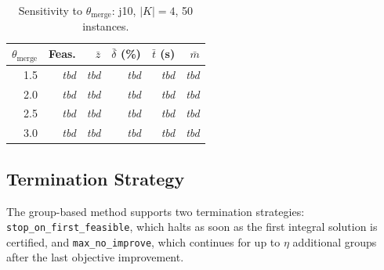 \begin{table}[htbp]
\centering
\renewcommand{\arraystretch}{1.35}
\caption{Sensitivity to $\theta_{\mathrm{merge}}$:
         j10, $|K|=4$, 50 instances.}
\label{tab:sens_merge}
\begin{tabular}{r r r r r r}
\hline
$\theta_{\mathrm{merge}}$ &
\textbf{Feas.} &
$\bar{z}$ &
$\bar{\delta}$ (\%) &
$\bar{t}$ (s) &
$\bar{m}$ \\
\hline
1.5 & \textit{tbd} & \textit{tbd} & \textit{tbd}
    & \textit{tbd} & \textit{tbd} \\
2.0 & \textit{tbd} & \textit{tbd} & \textit{tbd}
    & \textit{tbd} & \textit{tbd} \\
2.5 & \textit{tbd} & \textit{tbd} & \textit{tbd}
    & \textit{tbd} & \textit{tbd} \\
3.0 & \textit{tbd} & \textit{tbd} & \textit{tbd}
    & \textit{tbd} & \textit{tbd} \\
\hline
\end{tabular}
\end{table}


\subsection{Termination Strategy}
\label{subsec:sens_termination}



The group-based method supports two termination strategies:
\texttt{stop\_on\_first\_feasible}, which halts as soon as the
first integral solution is certified, and
\texttt{max\_no\_improve}, which continues for up to $\eta$
additional groups after the last objective improvement.

